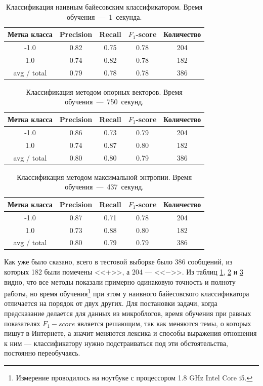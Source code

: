 \begin{table}[h]
    \centering
    \begin{tabular}{|c|c|c|c|c|}
      \hline
      \textbf{Метка класса} & \textbf{Precision} & \textbf{Recall} & \textbf{$F_1$-score} &
      \textbf{Количество} \\ \hline
      -1.0&0.82&0.75&0.78&204\\ \hline
      1.0&0.74&0.82&0.78&182\\ \hline \hline
      avg / total&0.79&0.78&0.78&386\\
      \hline
    \end{tabular}
    \caption{Классификация наивным байесовским классификатором. Время обучения~---~1~секунда.}\label{tab:nb}
\end{table}
\begin{table}[h!]
    \centering
    \begin{tabular}{|c|c|c|c|c|}
      \hline
      \textbf{Метка класса} & \textbf{Precision} & \textbf{Recall} & \textbf{$F_1$-score} &
      \textbf{Количество} \\ \hline
      -1.0&0.86&0.73&0.79&204\\ \hline
      1.0&0.74&0.87&0.80&182\\ \hline \hline
      avg / total&0.80&0.80&0.79&386\\
      \hline
    \end{tabular}
    \caption{Классификация методом опорных векторов. Время обучения~---~750~секунд.}\label{tab:svm}
\end{table}
\begin{table}[h!]
  \centering
    \begin{tabular}{|c|c|c|c|c|}
      \hline
      \textbf{Метка класса} & \textbf{Precision} & \textbf{Recall} & \textbf{$F_1$-score} & \textbf{Количество} \\ \hline
      -1.0&0.87&0.71&0.78&204\\ \hline
      1.0&0.73&0.88&0.80&182\\ \hline \hline
      avg / total&0.80&0.79&0.79&386\\
      \hline
    \end{tabular}
    \caption{Классификация методом максимальной энтропии. Время обучения~---~437~секунд.}\label{tab:maxent}
\end{table}

Как уже было сказано, всего в тестовой выборке было 386 сообщений, из которых 182 были помечены
<<+>>, а 204 --- <<$\minus$>>. Из таблиц \ref{tab:nb}, \ref{tab:svm} и \ref{tab:maxent} видно, что все методы показали
примерно одинаковую точность и полноту работы, но время обучения\footnote{Измерение проводилось на ноутбуке с процессором 1.8 GHz Intel Core i5.} при этом у наивного байесовского
классификатора отличается на порядок от двух других.  Для постановки задачи, когда предсказание делается для данных из
микроблогов, время обучения при равных показателях $F_1-score$ является решающим, так как меняются
темы, о которых пишут в Интернете, а значит меняются лексика и способы выражения отношения к ним ---
классификатору нужно подстраиваться под эти обстоятельства, постоянно переобучаясь.

